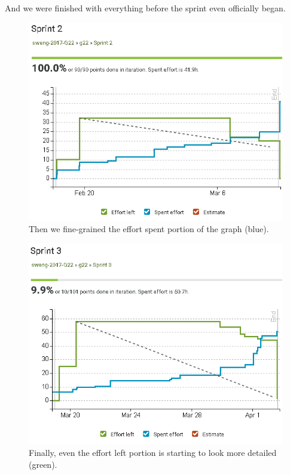 And we were finished with everything before the sprint even officially began.

\begin{figure}[H]
\centering
\caption{Then we fine-grained the effort spent portion of the graph (blue).}
\includegraphics[width=\textwidth]{sprint2}
\end{figure}

\begin{figure}[H]
\centering
\caption{Finally, even the effort left portion is starting to look more detailed (green).}
\includegraphics[width=\textwidth]{sprint3} %
\end{figure}

